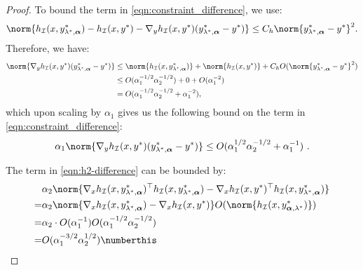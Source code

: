 \begin{proof}
To bound the term in \cref{eqn:constraint_difference}, we use:
\begin{align*}%
    \norm{h_\mathcal{I}(x,y_{\lambda^*,\boldsymbol{\alpha}}^*) - h_\mathcal{I}(x,y^*) - \nabla_y h_\mathcal{I}(x,y^*) (y_{\lambda^*,\boldsymbol{\alpha}}^* - y^*)} \leq C_h \norm{y_{\lambda^*,\boldsymbol{\alpha}}^* - y^*}^2. 
\end{align*}
Therefore, we have: 
\begin{align*}
     \norm{\nabla_y h_\mathcal{I}(x,y^*) (y_{\lambda^*,\boldsymbol{\alpha}}^* - y^*)} & \leq  \norm{h_\mathcal{I}(x,y_{\lambda^*,\boldsymbol{\alpha}}^*)} +\norm{h_\mathcal{I}(x,y^*)} + C_h O(\norm{y_{\lambda^*,\boldsymbol{\alpha}}^* - y^*}^2) \\
    & \leq O({{\alpha_1^{-1/2} \alpha_2^{-1/2}}}) + 0 + O({\alpha_1^{-2}}) \\
    & = O({{\alpha_1^{-1/2} \alpha_2^{-1/2}}} + {\alpha_1^{-2}}),%
\end{align*}
which upon scaling by $\alpha_1$ gives us the following bound on the term in \cref{eqn:constraint_difference}:
\begin{align*}
    \alpha_1 \norm{\nabla_y h_\mathcal{I}(x,y^*) (y_{\lambda^*,\boldsymbol{\alpha}}^* - y^*)} \leq O(\alpha_1^{1/2} \alpha_2^{-1/2} + \alpha_1^{-1}) ~.
\end{align*}


The term in \cref{eqn:h2-difference} can be bounded by:
\begin{align*}
    & \alpha_2 \norm{\nabla_x h_\mathcal{I}(x,y_{\lambda^*,\boldsymbol{\alpha}}^*)^\top h_\mathcal{I}(x,y_{\lambda^*,\boldsymbol{\alpha}}^*) - \nabla_x h_\mathcal{I}(x,y^*)^\top h_\mathcal{I}(x,y_{\lambda^*,\boldsymbol{\alpha}}^*)} \\
    = & \alpha_2 \norm{\nabla_x h_\mathcal{I}(x,y_{\lambda^*,\boldsymbol{\alpha}}^*) - \nabla_x h_\mathcal{I}(x,y^*)} O(\norm{h_\mathcal{I}(x,y^*_{\boldsymbol{\alpha},\lambda^*})})  \\
    = & \alpha_2\cdot O({\alpha_1^{-1}}) O({{\alpha_1^{-1/2} \alpha_2^{-1/2}}}) \\
    = & O(\alpha_1^{-3/2} \alpha_2^{1/2}) \numberthis\label{eq:bound_on_h_plus_grady_h}
\end{align*}


\end{proof}
